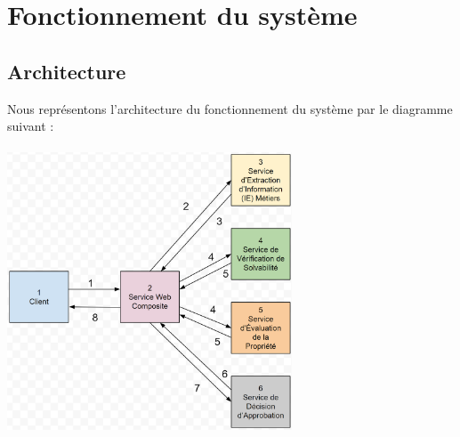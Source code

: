 \documentclass{article}
\begin{document}
	\section{Fonctionnement du système}
	\subsection{Architecture}
	Nous représentons l’architecture du fonctionnement du système par le diagramme suivant : 
	\\
	\\
		\includegraphics[width=240pt]{Images/4.1/architecture.png}
		
		\newpage
		
\end{document}
